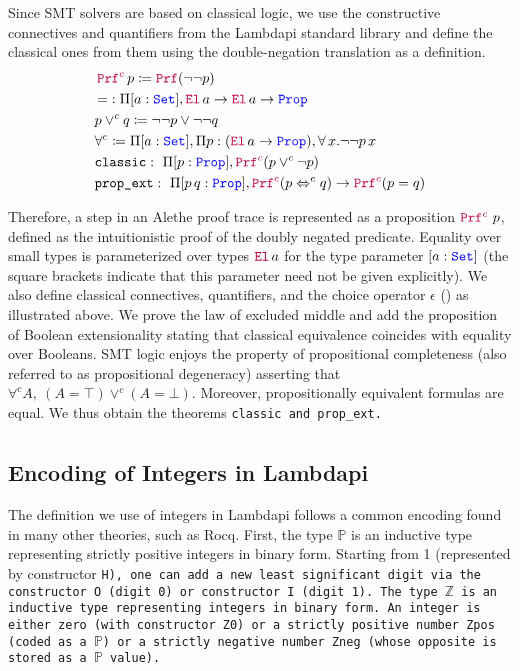 Since SMT solvers are based on classical logic, we use the constructive connectives and quantifiers from the Lambdapi standard library and define the classical ones from them using the double-negation translation \cite{dowek:classical} as a definition.
%
\begin{align*}
& \mathop{\textcolor{purple}{\texttt{\upshape{Prf}}^c}} p \coloneqq \mathop{\textcolor{purple}{\texttt{\upshape{Prf}}}{}} (\neg \neg p) \\
& \mathop{=}:  \Pi {[a: \textcolor{blue}{\texttt{\upshape{Set}}}]}, \textcolor{purple}{\texttt{\upshape{El}}}\, a \rightarrow \textcolor{purple}{\texttt{\upshape{El}}}\,a \rightarrow \textcolor{blue}{\texttt{\upshape{Prop}}} \\
& p \lor^c q \coloneqq  \neg \neg p \lor \neg \neg q \\
& \forall^c \coloneqq \Pi {[a: \textcolor{blue}{\texttt{\upshape{Set}}}]},  \Pi p: (\textcolor{purple}{\texttt{\upshape{El}}}\, a \rightarrow \textcolor{blue}{\texttt{\upshape{Prop}}}),  \forall \, x. \neg \neg  p\,x \\
&\texttt{classic}:\  \Pi [p: \textcolor{blue}{\texttt{\upshape{Prop}}}], \textcolor{purple}{\texttt{\upshape{Prf}}^c} (p \lor^c \neg p) \\
&\texttt{prop\_ext}:\  \Pi [p\,q: \textcolor{blue}{\texttt{\upshape{Prop}}}], \textcolor{purple}{\texttt{\upshape{Prf}}^c} (p \Leftrightarrow^c q ) \rightarrow \textcolor{purple}{\texttt{\upshape{Prf}}^c} (p = q) \\
\end{align*}

Therefore, a step in an Alethe proof trace is represented as a proposition $\textcolor{purple}{\texttt{\upshape{Prf}}^c}~p$, defined as the intuitionistic proof \prf{} of the doubly negated predicate.
Equality over small types is parameterized over types
$\textcolor{purple}{\texttt{\upshape{El}}}\,a$ for the type parameter $[a : \textcolor{blue}{\texttt{\upshape{Set}}}{}]$ (the square brackets indicate that this parameter need not be given explicitly).
We also define classical connectives, quantifiers, and the choice operator $\epsilon$ (\cite[\S 2.1]{alethespec}) as illustrated above.
We prove the law of excluded middle and add the proposition of Boolean extensionality stating that classical equivalence coincides with equality over Booleans.
SMT logic enjoys the property of propositional completeness (also referred to as propositional degeneracy) asserting that $\forall^c A,~(A = \top) \lor^c (A = \bot)$. Moreover, propositionally equivalent formulas are equal. We thus obtain the theorems
\tt{classic} and \tt{prop\_ext}.
\begin{align*}
\end{align*}

\subsection{Encoding of Integers in Lambdapi}

The definition we use of integers in Lambdapi follows a common encoding found in many other theories, such as Rocq.
First, the type $\mathbb{P}$  is an inductive type representing strictly positive integers in binary form.
Starting from 1 (represented by constructor \tt{H}), one can add a new least significant digit via the constructor \tt{O} (digit 0) or constructor \tt{I} (digit 1). 
The type $\mathbb{Z}$ is an inductive type representing integers in binary form.
An integer is either zero (with constructor \tt{Z0}) or a strictly positive number \tt{Zpos} (coded as a $\mathbb{P}$) or a strictly negative number \tt{Zneg} (whose opposite is stored as a $\mathbb{P}$ value).

